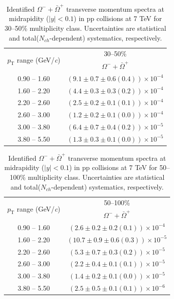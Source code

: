 \begin{table}
\caption{Identified $\Omega^{-} + \bar{\Omega}^{+}$ transverse momentum spectra at midrapidity ($|y|<0.1$) in pp collisions at 7 TeV for 30--50\% multiplicity class. Uncertainties are statistical and total($N_{ch}$-dependent) systematics, respectively.}
\label{tab:OmegaSum_30to50}
\begin{center}
\begin{tabular}{ c | c }
\hline
\multirow{2}{*}{$p_{\mathrm{T}}$ range (GeV/\textit{c})} & \multicolumn{1}{c}{30--50\%} \\ & $\Omega^{-} + \bar{\Omega}^{+}$\\ 
\hline
0.90 -- 1.60 & $(9.1\pm0.7\pm0.6(0.4))\times10^{-4}$ \\ 
1.60 -- 2.20 & $(4.4\pm0.3\pm0.3(0.2))\times10^{-4}$ \\ 
2.20 -- 2.60 & $(2.5\pm0.2\pm0.1(0.1))\times10^{-4}$ \\ 
2.60 -- 3.00 & $(1.2\pm0.2\pm0.1(0.0))\times10^{-4}$ \\ 
3.00 -- 3.80 & $(6.4\pm0.7\pm0.4(0.2))\times10^{-5}$ \\ 
3.80 -- 5.50 & $(1.3\pm0.3\pm0.1(0.0))\times10^{-5}$ \\ 
\hline
\end{tabular}
\end{center}
\end{table}
 
\begin{table}
\caption{Identified $\Omega^{-} + \bar{\Omega}^{+}$ transverse momentum spectra at midrapidity ($|y|<0.1$) in pp collisions at 7 TeV for 50--100\% multiplicity class. Uncertainties are statistical and total($N_{ch}$-dependent) systematics, respectively.}
\label{tab:OmegaSum_50to100}
\begin{center}
\begin{tabular}{ c | c }
\hline
\multirow{2}{*}{$p_{\mathrm{T}}$ range (GeV/\textit{c})} & \multicolumn{1}{c}{50--100\%} \\ & $\Omega^{-} + \bar{\Omega}^{+}$\\ 
\hline
0.90 -- 1.60 & $(2.6\pm0.2\pm0.2(0.1))\times10^{-4}$ \\ 
1.60 -- 2.20 & $(10.7\pm0.9\pm0.6(0.3))\times10^{-5}$ \\ 
2.20 -- 2.60 & $(5.3\pm0.7\pm0.3(0.2))\times10^{-5}$ \\ 
2.60 -- 3.00 & $(2.2\pm0.4\pm0.1(0.1))\times10^{-5}$ \\ 
3.00 -- 3.80 & $(1.4\pm0.2\pm0.1(0.0))\times10^{-5}$ \\ 
3.80 -- 5.50 & $(2.5\pm0.5\pm0.1(0.1))\times10^{-6}$ \\ 
\hline
\end{tabular}
\end{center}
\end{table}
 
